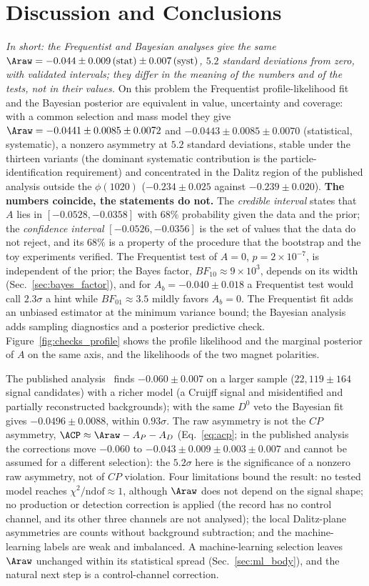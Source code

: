 \section{Discussion and Conclusions}
\label{sec:conclusions}
\label{sec:comparison}
\emph{In short: the Frequentist and Bayesian analyses give the same $\Araw=-0.044\pm0.009\,(\text{stat})\pm0.007\,(\text{syst})$, $5.2$ standard deviations from zero, with validated intervals; they differ in the meaning of the numbers and of the tests, not in their values.}
On this problem the Frequentist profile-likelihood fit and the Bayesian posterior are equivalent in value, uncertainty and coverage: with a common selection and mass model they give $\Araw=-0.0441\pm0.0085\pm0.0072$ and $-0.0443\pm0.0085\pm0.0070$ (statistical, systematic), a nonzero asymmetry at $5.2$ standard deviations, stable under the thirteen variants (the dominant systematic contribution is the particle-identification requirement) and concentrated in the Dalitz region of the published analysis outside the $\phi(1020)$ ($-0.234\pm0.025$ against $-0.239\pm0.020$).
\textbf{The numbers coincide, the statements do not.} The \emph{credible interval} states that $A$ lies in $[-0.0528,-0.0358]$ with $68\%$ probability given the data and the prior; the \emph{confidence interval} $[-0.0526,-0.0356]$ is the set of values that the data do not reject, and its $68\%$ is a property of the procedure that the bootstrap and the toy experiments verified. The Frequentist test of $A=0$, $p=2\times10^{-7}$, is independent of the prior; the Bayes factor, $BF_{10}\approx9\times10^3$, depends on its width (Sec.~\ref{sec:bayes_factor}), and for $A_b=-0.040\pm0.018$ a Frequentist test would call $2.3\sigma$ a hint while $BF_{01}\approx3.5$ mildly favors $A_b=0$. The Frequentist fit adds an unbiased estimator at the minimum variance bound; the Bayesian analysis adds sampling diagnostics and a posterior predictive check. Figure~\ref{fig:checks_profile} shows the profile likelihood and the marginal posterior of $A$ on the same axis, and the likelihoods of the two magnet polarities.

\label{sec:comparison_published}
The published analysis~\cite{lhcb_cpv_2013} finds $-0.060\pm0.007$ on a larger sample ($22{,}119\pm164$ signal candidates) with a richer model (a Cruijff signal and misidentified and partially reconstructed backgrounds); with the same $D^0$ veto the Bayesian fit gives $-0.0496\pm0.0088$, within $0.93\sigma$. The raw asymmetry is not the $CP$ asymmetry, $\ACP\approx\Araw-A_P-A_D$ (Eq.~\eqref{eq:acp}; in the published analysis the corrections move $-0.060$ to $-0.043\pm0.009\pm0.003\pm0.007$ and cannot be assumed for a different selection): the $5.2\sigma$ here is the significance of a nonzero raw asymmetry, not of $CP$ violation. Four limitations bound the result: no tested model reaches $\chi^2/\mathrm{ndof}\approx1$, although $\Araw$ does not depend on the signal shape; no production or detection correction is applied (the record has no control channel, and its other three channels are not analysed); the local Dalitz-plane asymmetries are counts without background subtraction; and the machine-learning labels are weak and imbalanced. A machine-learning selection leaves $\Araw$ unchanged within its statistical spread (Sec.~\ref{sec:ml_body}), and the natural next step is a control-channel correction.
